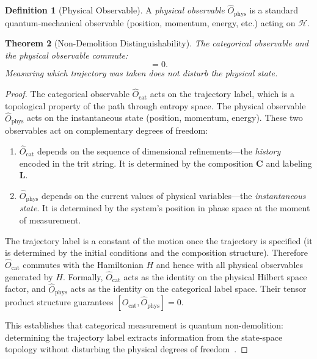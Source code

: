 \documentclass[twocolumn,10pt,a4paper]{article}
\newtheorem{theorem}{Theorem}[section]
\theoremstyle{definition}
\newtheorem{definition}[theorem]{Definition}
\theoremstyle{remark}
\newcommand{\Hilbert}{\mathcal{H}}
\newcommand{\Ocat}{\hat{O}_{\mathrm{cat}}}
\newcommand{\Ophys}{\hat{O}_{\mathrm{phys}}}
\begin{document}
\begin{definition}[Physical Observable]
\label{def:phys_obs}
A \emph{physical observable} $\Ophys$ is a standard quantum-mechanical observable (position, momentum, energy, etc.) acting on $\Hilbert$.
\end{definition}

\begin{theorem}[Non-Demolition Distinguishability]
\label{thm:nondemolition}
The categorical observable and the physical observable commute:
\begin{equation}
[\Ocat, \Ophys] = 0.
\end{equation}
Measuring which trajectory was taken does not disturb the physical state.
\end{theorem}

\begin{proof}
The categorical observable $\Ocat$ acts on the trajectory label, which is a topological property of the path through entropy space. The physical observable $\Ophys$ acts on the instantaneous state (position, momentum, energy). These two observables act on complementary degrees of freedom:

\begin{enumerate}[label=(\roman*)]
\item $\Ocat$ depends on the sequence of dimensional refinements---the \emph{history} encoded in the trit string. It is determined by the composition $\mathbf{C}$ and labeling $\mathbf{L}$.
\item $\Ophys$ depends on the current values of physical variables---the \emph{instantaneous state}. It is determined by the system's position in phase space at the moment of measurement.
\end{enumerate}

The trajectory label is a constant of the motion once the trajectory is specified (it is determined by the initial conditions and the composition structure). Therefore $\Ocat$ commutes with the Hamiltonian $H$ and hence with all physical observables generated by $H$. Formally, $\Ocat$ acts as the identity on the physical Hilbert space factor, and $\Ophys$ acts as the identity on the categorical label space. Their tensor product structure guarantees $[\Ocat, \Ophys] = 0$.

This establishes that categorical measurement is quantum non-demolition: determining the trajectory label extracts information from the state-space topology without disturbing the physical degrees of freedom~\cite{sachikonye2025trans}.
\end{proof}
\end{document}
